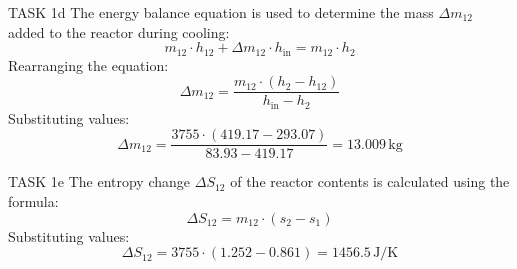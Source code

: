 TASK 1d  
The energy balance equation is used to determine the mass \( \Delta m_{12} \) added to the reactor during cooling:  
\[
m_{12} \cdot h_{12} + \Delta m_{12} \cdot h_{\text{in}} = m_{12} \cdot h_{2}
\]  
Rearranging the equation:  
\[
\Delta m_{12} = \frac{m_{12} \cdot (h_{2} - h_{12})}{h_{\text{in}} - h_{2}}
\]  
Substituting values:  
\[
\Delta m_{12} = \frac{3755 \cdot (419.17 - 293.07)}{83.93 - 419.17} = 13.009 \, \text{kg}
\]  

TASK 1e  
The entropy change \( \Delta S_{12} \) of the reactor contents is calculated using the formula:  
\[
\Delta S_{12} = m_{12} \cdot (s_{2} - s_{1})
\]  
Substituting values:  
\[
\Delta S_{12} = 3755 \cdot (1.252 - 0.861) = 1456.5 \, \text{J/K}
\]